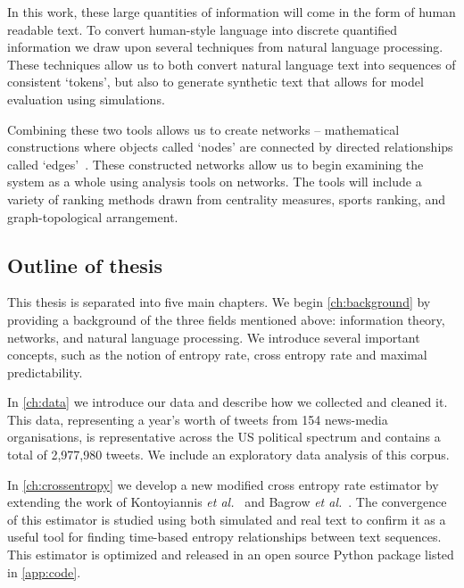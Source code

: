 In this work, these large quantities of information will come in the form of human readable text. To convert human-style language into discrete quantified information we draw upon several techniques from natural language processing. These techniques allow us to both convert natural language text into sequences of consistent `tokens', but also to generate synthetic text that allows for model evaluation using simulations. 

Combining these two tools allows us to create networks -- mathematical constructions where objects called `nodes' are connected by directed relationships called `edges'~\cite{newman_networks_2018}. These constructed networks allow us to begin examining the system as a whole using analysis tools on networks. The tools will include a variety of ranking methods drawn from centrality measures, sports ranking, and graph-topological arrangement.


\subsection{Outline of thesis}



This thesis is separated into five main chapters. We begin \autoref{ch:background} by providing a background of the three fields mentioned above: information theory, networks, and natural language processing. We introduce several important concepts, such as the notion of entropy rate, cross entropy rate and maximal predictability.

In \autoref{ch:data} we introduce our data and describe how we collected and cleaned it. This data, representing a year's worth of tweets from 154 news-media organisations, is representative across the US political spectrum and contains a total of 2,977,980 tweets. We include an exploratory data analysis of this corpus.

In \autoref{ch:crossentropy} we develop a new modified cross entropy rate estimator by extending the work of Kontoyiannis \emph{et al.}~\cite{kontoyiannis_nonparametric_1998} and Bagrow \emph{et al.}~\cite{bagrowInformationFlowReveals2019}. The convergence of this estimator is studied using both simulated and real text to confirm it as a useful tool for finding time-based entropy relationships between text sequences. This estimator is optimized and released in an open source Python package listed in \autoref{app:code}.

